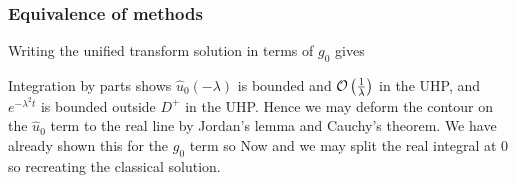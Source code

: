 \documentclass{article}
\begin{document}
\subsubsection{Equivalence of methods}
Writing the unified transform solution in terms of $g_0$ gives 

Integration by parts shows $\hat{u}_0(-\lambda)$ is bounded and $\mathcal{O}\left( \frac{1}{\lambda} \right)$ in the UHP, and $e^{-\lambda^2 t}$ is bounded outside $D^+$ in the UHP. Hence we may deform the contour on the $\hat{u}_0$ term to the real line by Jordan's lemma and Cauchy's theorem. We have already shown this for the $g_0$ term so 
Now 
and we may split the real integral at 0 so 
recreating the classical solution. 

\end{document}
